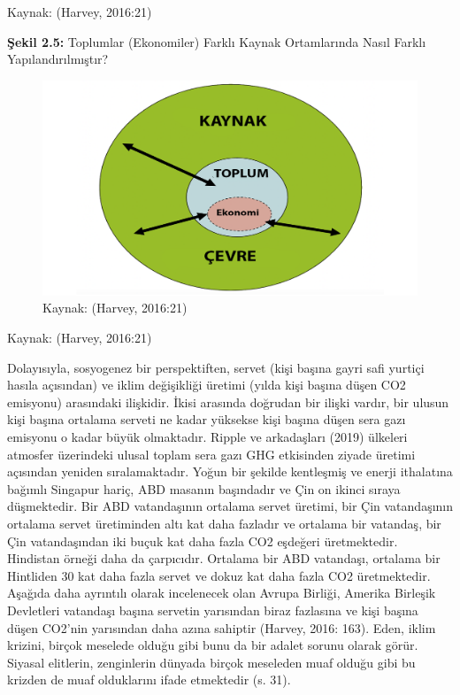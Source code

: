 \documentclass[
]{book}
\begin{document}
Kaynak: (Harvey, 2016:21)

\textbf{Şekil 2.5:} Toplumlar (Ekonomiler) Farklı Kaynak Ortamlarında Nasıl Farklı Yapılandırılmıştır?

\begin{figure}
\includegraphics[width=0.95\linewidth,height=0.95\textheight]{tablolar-sekiller/sekil-2-5} \caption{Kaynak: (Harvey, 2016:21)}\label{fig:unnamed-chunk-6}
\end{figure}

Kaynak: (Harvey, 2016:21)

Dolayısıyla, sosyogenez bir perspektiften, servet (kişi başına gayri safi yurtiçi hasıla açısından) ve iklim değişikliği üretimi (yılda kişi başına düşen CO2 emisyonu) arasındaki ilişkidir. İkisi arasında doğrudan bir ilişki vardır, bir ulusun kişi başına ortalama serveti ne kadar yüksekse kişi başına düşen sera gazı emisyonu o kadar büyük olmaktadır. Ripple ve arkadaşları (2019) ülkeleri atmosfer üzerindeki ulusal toplam sera gazı GHG etkisinden ziyade üretimi açısından yeniden sıralamaktadır. Yoğun bir şekilde kentleşmiş ve enerji ithalatına bağımlı Singapur hariç, ABD masanın başındadır ve Çin on ikinci sıraya düşmektedir. Bir ABD vatandaşının ortalama servet üretimi, bir Çin vatandaşının ortalama servet üretiminden altı kat daha fazladır ve ortalama bir vatandaş, bir Çin vatandaşından iki buçuk kat daha fazla CO2 eşdeğeri üretmektedir. Hindistan örneği daha da çarpıcıdır. Ortalama bir ABD vatandaşı, ortalama bir Hintliden 30 kat daha fazla servet ve dokuz kat daha fazla CO2 üretmektedir. Aşağıda daha ayrıntılı olarak incelenecek olan Avrupa Birliği, Amerika Birleşik Devletleri vatandaşı başına servetin yarısından biraz fazlasına ve kişi başına düşen CO2'nin yarısından daha azına sahiptir (Harvey, 2016: 163). Eden, iklim krizini, birçok meselede olduğu gibi bunu da bir adalet sorunu olarak görür. Siyasal elitlerin, zenginlerin dünyada birçok meseleden muaf olduğu gibi bu krizden de muaf olduklarını ifade etmektedir (s. 31). \citep{eden2015iklim}
\end{document}
